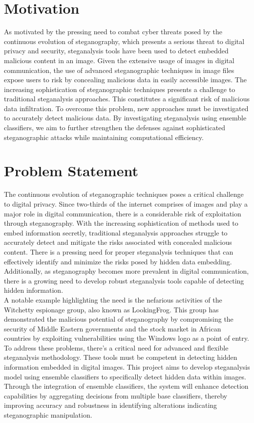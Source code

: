 \section{Motivation}
As motivated by the pressing need to combat cyber threats posed by the continuous evolution of steganography, which presents a serious threat to digital privacy and security, steganalysis tools have been used to detect embedded malicious content in an image. Given the extensive usage of images in digital communication, the use of advanced steganographic techniques in image files expose users to risk by concealing malicious data in easily accessible images. The increasing sophistication of steganographic techniques presents a challenge to traditional steganalysis approaches. This constitutes a significant risk of malicious data infiltration. To overcome this problem, new approaches must be investigated to accurately detect malicious data. By investigating steganalysis using ensemble classifiers, we aim to further strengthen the defenses against sophisticated steganographic attacks while maintaining computational efficiency.\\

\section{Problem Statement} 
The continuous evolution of steganographic techniques poses a critical challenge to digital privacy. Since two-thirds of the internet comprises of images and play a major role in digital communication, there is a considerable risk of exploitation through steganography. With the increasing sophistication of methods used to embed information secretly, traditional steganalysis approaches struggle to accurately detect and mitigate the risks associated with concealed malicious content. There is a pressing need for proper steganalysis techniques that can effectively identify and minimize the risks posed by hidden data embedding. Additionally, as steganography becomes more prevalent in digital communication, there is a growing need to develop robust steganalysis tools capable of detecting hidden information.\\
A notable example highlighting the need is the nefarious activities of the Witchetty espionage group, also known as LookingFrog. This group has demonstrated the malicious potential of steganography by compromising the security of Middle Eastern governments and the stock market in African countries by exploiting vulnerabilities using the Windows logo as a point of entry.\\
To address these problems, there’s a critical need for advanced and flexible steganalysis methodology. These tools must be competent in detecting hidden information embedded in digital images. This project aims to develop steganalysis model using ensemble classifiers to specifically detect hidden data within images. Through the integration of ensemble classifiers, the system will enhance detection capabilities by aggregating decisions from multiple base classifiers, thereby improving accuracy and robustness in identifying alterations indicating steganographic manipulation. 
\\
\clearpage

